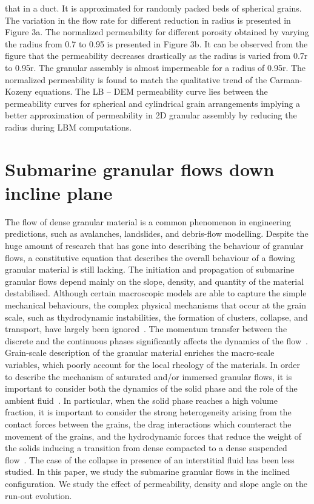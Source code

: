 that in a duct. It is approximated for randomly packed beds of spherical 
grains. The variation in the flow rate for different reduction in radius is 
presented in Figure 3a. The normalized permeability for different porosity 
obtained by varying the radius from 0.7 to 0.95 is presented in Figure 3b.
It can be observed from the figure that the permeability decreases drastically 
as the radius is varied from 0.7r to 0.95r. The granular assembly is almost 
impermeable for a radius of 0.95r. The normalized permeability is found to 
match the qualitative trend of the Carman-Kozeny equations. The LB – DEM 
permeability curve lies between the permeability curves for spherical and 
cylindrical grain arrangements implying a better approximation of permeability 
in 2D granular assembly by reducing the radius during LBM computations.


\section{Submarine granular flows down incline plane}



The flow of dense granular material is a common phenomenon in engineering 
predictions, such as avalanches, landslides, and debris-flow modelling. Despite 
the huge amount of research that has gone into describing the behaviour of 
granular flows, a constitutive equation that describes the overall behaviour of 
a flowing granular material is still lacking. The initiation and propagation of 
submarine granular flows depend mainly on the slope, density, and quantity of 
the material destabilised. Although certain macroscopic models are able to 
capture the simple mechanical behaviours, the complex physical mechanisms that 
occur at the grain scale, such as thydrodynamic instabilities, the formation of 
clusters, collapse, and transport, have largely been ignored~\citep{Topin2011}. 
The momentum transfer between the discrete and the continuous phases 
significantly affects the dynamics of the flow~\citep{Peker2007}. Grain-scale 
description of the granular material enriches the macro-scale variables,  which 
poorly account for the local rheology of the materials.  In order to describe 
the mechanism of saturated and/or immersed granular flows, it is important to 
consider both the dynamics of the solid phase and the role of the ambient 
fluid~\citep{Denlinger2001}. In particular, when the solid phase reaches a high 
volume fraction, it is important to consider the strong heterogeneity arising 
from the contact forces between the grains, the drag interactions which 
counteract the movement of the grains, and the hydrodynamic forces that reduce 
the weight of the solids inducing a transition from dense compacted to a dense 
suspended flow~\citep{Meruane2010}. The case of the collapse in presence of an 
interstitial fluid has been less studied. In this paper, we study the submarine 
granular flows in the inclined configuration. We study the effect of 
permeability, density and slope angle on the run-out evolution.



